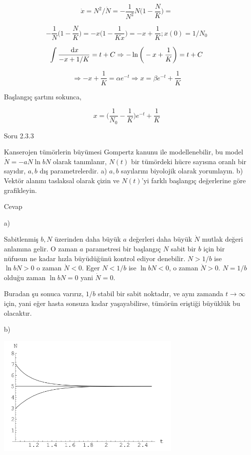 \documentclass[12pt,fleqn]{article}\usepackage{../../common}
\begin{document}
$$ \dot{x} = N^2/\dot{N} = -\frac{1}{N^2}N\bigg( 1 - \frac{N}{K} \bigg) = $$

$$ -\frac{1}{N} \bigg( 1 - \frac{N}{K} \bigg) = -x \bigg( 1 - \frac{1}{Kx}\bigg) =
-x + \frac{1}{K}; x(0) = 1/N_0
$$

$$
\int \frac{\,\mathrm{d} x}{-x + 1/K} = t + C \Rightarrow
-\ln \bigg( -x + \frac{1}{K}\bigg) = t + C
$$ 

$$ \Rightarrow -x + \frac{1}{K} = \alpha e^{-t} \Rightarrow
x = \beta e^{-t} +\frac{1}{K}
$$

Başlangıç şartını sokunca,

$$ x = \bigg( \frac{1}{N_0} - \frac{1}{K} \bigg) e^{-t} + \frac{1}{K}$$

Soru 2.3.3

Kanserojen tümörlerin büyümesi Gompertz kanunu ile modellenebilir, bu model
$\dot{N} = -a N \ln bN $ olarak tanımlanır, $N(t)$ bir tümördeki hücre sayısına
oranlı bir sayıdır, $a,b$ dış parametrelerdir. a) $a,b$ sayılarını biyolojik
olarak yorumlayın. b) Vektör alanını taslaksal olarak çizin ve $N(t)$'yi farklı
başlangıç değerlerine göre grafikleyin.

Cevap

a)

Sabitlenmiş $b,N$ üzerinden daha büyük $a$ değerleri daha büyük $\dot{N}$ mutlak
değeri anlamına gelir. O zaman $a$ parametresi bir başlangıç $N$ sabit bir $b$
için bir nüfusun ne kadar hızla büyüdüğünü kontrol ediyor denebilir. $N > 1/b$
ise $\ln bN>0$ o zaman $\dot{N} < 0$. Eger $N<1/b$ ise $\ln bN < 0$, o zaman
$\dot{N}>0$. $N=1/b$ olduğu zaman $\ln bN = 0$ yani $\dot{N}=0$.

Buradan şu sonuca varırız, $1/b$ stabil bir sabit noktadır, ve aynı zamanda
$t \to \infty$ için, yani eğer hasta sonsuza kadar yaşayabilirse, tümörün
eriştiği büyüklük bu olacaktır.

b)

\includegraphics[height=6cm]{03_14.png}
\end{document}
